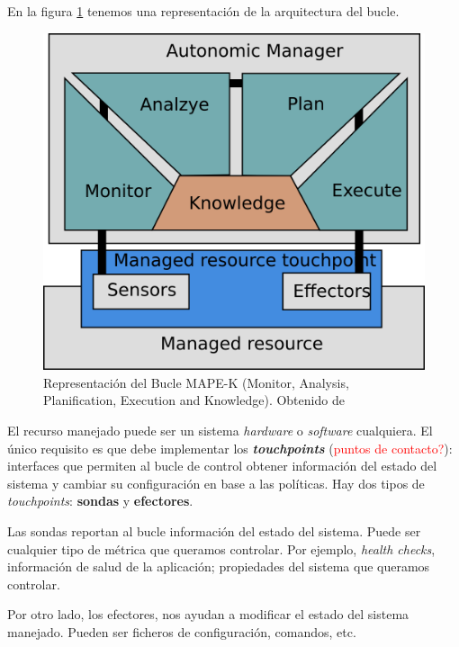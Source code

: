 En la figura \ref{fig:bucle-mapek} tenemos una representación de la arquitectura del bucle.

\begin{figure}[h]
  \centering
  \includegraphics[scale=1.35]{01_introduccion/images/bucle-mape-k}
  \caption[Representación del Bucle MAPE-K (Monitor, Analysis, Planification, Execution and Knowledge)]{Representación del Bucle MAPE-K (Monitor, Analysis, Planification, Execution and Knowledge). Obtenido de \cite{fonsEspecificacionSistemasAutoadaptativos2021}}
  \label{fig:bucle-mapek}
\end{figure}

El recurso manejado puede ser un sistema \emph{hardware} o \emph{software} cualquiera. El único requisito es que debe implementar los \textbf{\emph{touchpoints}} (\textcolor{red}{puntos de contacto?}): interfaces que permiten al bucle de control obtener información del estado del sistema y cambiar su configuración en base a las políticas. Hay dos tipos de \emph{touchpoints}: \textbf{sondas} y \textbf{efectores}.

Las sondas reportan al bucle información del estado del sistema. Puede ser cualquier tipo de métrica que queramos controlar. Por ejemplo, \emph{health checks}, información de salud de la aplicación; propiedades del sistema que queramos controlar.

Por otro lado, los efectores, nos ayudan a modificar el estado del sistema manejado. Pueden ser ficheros de configuración, comandos, etc.

